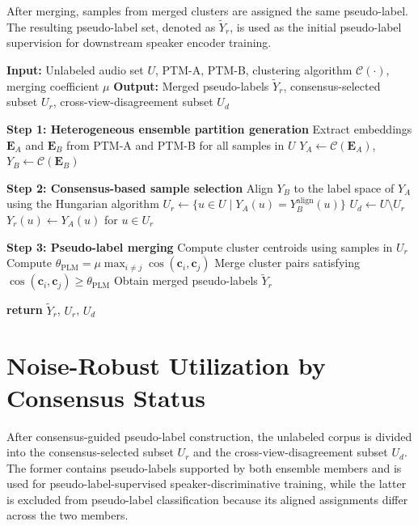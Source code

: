 \documentclass[journal]{IEEEtran}
\begin{document}
After merging, samples from merged clusters are assigned the same
pseudo-label.
The resulting pseudo-label set, denoted as $\tilde{Y}_r$, is used as
the initial pseudo-label supervision for downstream speaker encoder
training.
\begin{algorithm}[t]
\caption{\textbf{CGPL:} Consensus-Guided Reliable Pseudo-Label Construction}
\label{alg:agpl}
\begin{algorithmic}
\STATE
\STATE \textbf{Input:} Unlabeled audio set $U$, PTM-A, PTM-B, clustering algorithm $\mathcal{C}(\cdot)$, merging coefficient $\mu$
\STATE \textbf{Output:} Merged pseudo-labels $\tilde{Y}_r$, consensus-selected subset $U_r$, cross-view-disagreement subset $U_d$

\STATE \textbf{Step 1: Heterogeneous ensemble partition generation}
\STATE Extract embeddings $\mathbf{E}_A$ and $\mathbf{E}_B$ from PTM-A and PTM-B for all samples in $U$
\STATE $Y_A \gets \mathcal{C}(\mathbf{E}_A)$, \quad $Y_B \gets \mathcal{C}(\mathbf{E}_B)$

\STATE \textbf{Step 2: Consensus-based sample selection}
\STATE Align $Y_B$ to the label space of $Y_A$ using the Hungarian algorithm
\STATE $U_r \gets \{u\in U \mid Y_A(u)=Y_B^{\mathrm{align}}(u)\}$
\STATE $U_d \gets U \setminus U_r$
\STATE $Y_r(u)\gets Y_A(u)$ for $u\in U_r$

\STATE \textbf{Step 3: Pseudo-label merging}
\STATE Compute cluster centroids using samples in $U_r$
\STATE Compute $\theta_{\mathrm{PLM}}=\mu\max_{i\neq j}\cos(\mathbf{c}_i,\mathbf{c}_j)$
\STATE Merge cluster pairs satisfying $\cos(\mathbf{c}_i,\mathbf{c}_j)\ge\theta_{\mathrm{PLM}}$
\STATE Obtain merged pseudo-labels $\tilde{Y}_r$

\STATE \textbf{return} $\tilde{Y}_r$, $U_r$, $U_d$
\end{algorithmic}
\end{algorithm}
\section{Noise-Robust Utilization by Consensus Status}

After consensus-guided pseudo-label construction, the unlabeled corpus is divided into the consensus-selected subset $U_r$ and the cross-view-disagreement subset $U_d$.
The former contains pseudo-labels supported by both ensemble members and is used for pseudo-label-supervised speaker-discriminative training, while the latter is excluded from pseudo-label classification because its aligned assignments differ across the two members.
\end{document}
